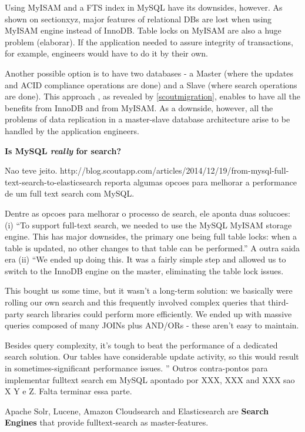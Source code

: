 Using MyISAM and a FTS index in MySQL have its downsides, however. As shown on section{xyz}, major features of relational DBs are lost when using MyISAM engine instead of InnoDB. Table locks on MyISAM are also a huge problem (elaborar). If the application needed to assure integrity of transactions, for example, engineers would have to do it by their own.

Another possible option is to have two databases - a Master (where the updates and ACID compliance operations are done) and a Slave (where search operations are done). This approach , as revealed by \ref{scoutmigration}, enables to have all the benefits from InnoDB and from MyISAM. As a downside, however, all the problems of data replication in a master-slave database architecture arise to be handled by the application engineers. 

\textbf{Is MySQL \textit{really} for search?}


	Nao teve jeito. 
	http://blog.scoutapp.com/articles/2014/12/19/from-mysql-full-text-search-to-elasticsearch reporta algumas opcoes para melhorar a performance de um full text search com MySQL. 

	Dentre as opcoes para melhorar o processo de search, ele aponta duas solucoes: (i) ``To support full-text search, we needed to use the MySQL MyISAM storage engine. This has major downsides, the primary one being full table locks: when a table is updated, no other changes to that table can be performed.'' A outra saida era (ii) ``We ended up doing this. It was a fairly simple step and allowed us to switch to the InnoDB engine on the master, eliminating the table lock issues.

	This bought us some time, but it wasn't a long-term solution: we basically were rolling our own search and this frequently involved complex queries that third-party search libraries could perform more efficiently. We ended up with massive queries composed of many JOINs plus AND/ORs - these aren't easy to maintain.

	Besides query complexity, it's tough to beat the performance of a dedicated search solution. Our tables have considerable update activity, so this would result in sometimes-significant performance issues.
	''
	Outros contra-pontos para implementar fulltext search em MySQL apontado por XXX, XXX and XXX sao X Y e Z. Falta terminar essa parte.

	Apache Solr, Lucene, Amazon Cloudsearch and Elasticsearch are \textbf{Search Engines} that provide fulltext-search as master-features. 

